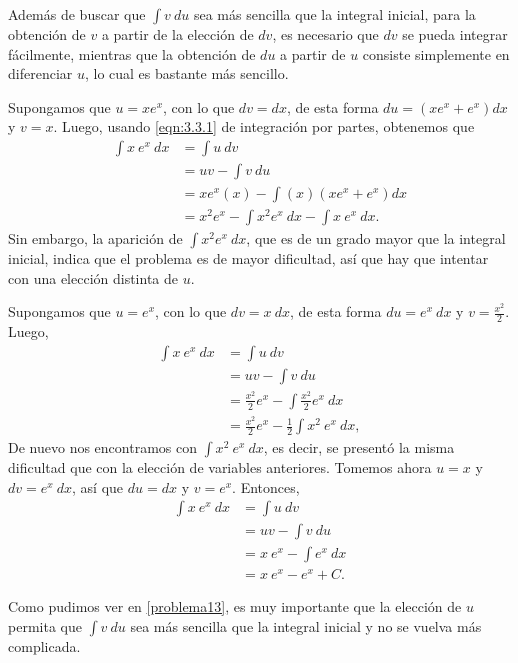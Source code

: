 Además de buscar que $\int v\:du$ sea más sencilla que la integral inicial, para la obtención de $v$ a partir de la elección de $dv$, es necesario que $dv$ se pueda integrar fácilmente, mientras que la obtención de $du$ a partir de $u$ consiste simplemente en diferenciar $u$, lo cual es bastante más sencillo.
\begin{problema}[$\int x\:e^x\:dx$]\label{problema13}
	Supongamos que $u=xe^x$, con lo que $dv=dx$, de esta forma $du=(xe^x+e^x)dx$ y $v=x$. Luego, usando \cref{eqn:3.3.1} de integración por partes, obtenemos que
	\begin{align*}
		\int x\:e^x\:dx&=\int u\:dv\\
					&=uv-\int v\:du\\
					&=xe^x(x)-\int (x)(xe^x+e^x)dx\\
					&=x^2e^x-\int x^2e^x\:dx-\int x\:e^x\:dx.
	\end{align*}
	Sin embargo, la aparición de $\int x^2e^x\:dx$, que es de un grado mayor que la integral inicial, indica que el problema es de mayor dificultad, así que hay que intentar con una elección distinta de $u$.
	
	Supongamos que $u=e^x$, con lo que $dv=x\: dx$, de esta forma $du=e^x\:dx$ y $v=\frac{x^2}{2}$. Luego,
	\begin{align*}
		\int x\:e^x\:dx&=\int u\:dv\\
					&=uv-\int v\:du\\
					&=\frac{x^2}{2}e^x-\int \frac{x^2}{2}e^x\:dx\\
					&=\frac{x^2}{2}e^x-\frac{1}{2}\int x^2\:e^x\:dx,
	\end{align*}
	De nuevo nos encontramos con $\int x^2\:e^x\:dx$, es decir, se presentó la misma dificultad que con la elección de variables anteriores. Tomemos ahora $u=x$ y $dv=e^x\:dx$, así que $du=dx$ y $v=e^x$. Entonces,
	\begin{align*}
		\int x\:e^x\:dx&=\int u\:dv\\
					&=uv-\int v\:du\\
					&=x\:e^x-\int e^x\:dx\\
					&=x\:e^x-e^x+C.
	\end{align*}
\end{problema}
Como pudimos ver en \cref{problema13}, es muy importante que la elección de $u$ permita que $\int v\:du$ sea más sencilla que la integral inicial y no se vuelva más complicada.
